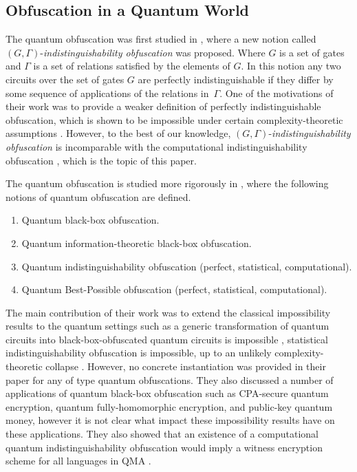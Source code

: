 \subsection{Obfuscation in a Quantum World}
\label{sec:obf-quantum}
The quantum obfuscation was first studied in \cite{AJJ14}, where a new notion called
$(G,\Gamma)$-{\em indistinguishability obfuscation} was proposed. Where $G$ is a set of gates and $\Gamma$ is a set of relations satisfied by the elements of $G.$ In this notion any two circuits over the set of gates $G$ are perfectly indistinguishable if they differ by some sequence of applications of the relations in~$\Gamma.$ One of the motivations of their work was to provide a weaker definition of perfectly indistinguishable obfuscation, which is shown to be impossible under certain complexity-theoretic assumptions \cite{AJJ14}. However, to the best of our knowledge, $(G,\Gamma)$-{\em indistinguishability obfuscation} is  incomparable with the computational indistinguishability obfuscation \cite{BGI+12, GGH+13}, which is the topic of this paper.

The quantum obfuscation is studied more rigorously in \cite{AF16arxiv}, where the following notions of quantum obfuscation are defined.
\begin{enumerate}
\item Quantum black-box obfuscation.
\item Quantum information-theoretic black-box obfuscation.
\item Quantum indistinguishability obfuscation (perfect, statistical, computational).
\item Quantum Best-Possible obfuscation (perfect, statistical, computational).
\end{enumerate}

 The main contribution of their work was to extend the classical impossibility results to the quantum settings such as a generic transformation of quantum circuits into black-box-obfuscated quantum circuits is impossible \cite{AF16arxiv},  statistical indistinguishability obfuscation is impossible, up to an unlikely complexity-theoretic collapse \cite{AF16arxiv}. However, no concrete instantiation was provided in their paper for any of type quantum obfuscations. They also discussed a number of applications of quantum black-box obfuscation such as CPA-secure quantum encryption, quantum fully-homomorphic encryption, and public-key quantum money, however it is not clear what impact these impossibility results have on these applications. They also showed that an existence of a computational quantum indistinguishability obfuscation would imply a witness encryption scheme for all languages in QMA  \cite{AF16arxiv}.


